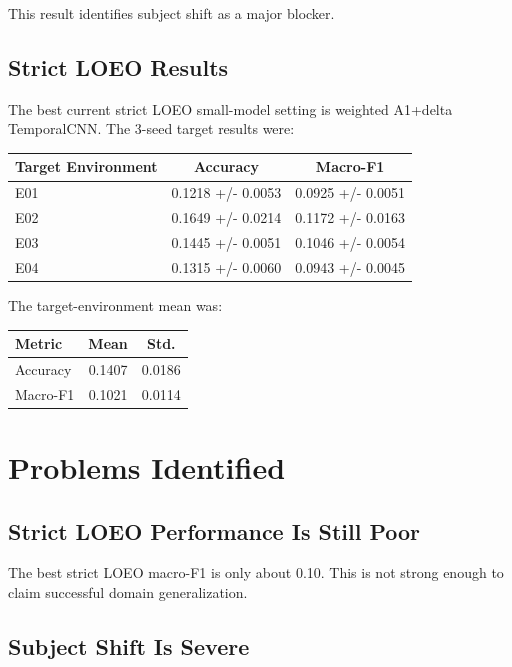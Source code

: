 \documentclass[11pt]{article}
\begin{document}
This result identifies subject shift as a major blocker.

\subsection{Strict LOEO Results}

The best current strict LOEO small-model setting is weighted A1+delta TemporalCNN. The 3-seed target results were:

\begin{center}
\begin{tabular}{lcc}
\toprule
Target Environment & Accuracy & Macro-F1 \\
\midrule
E01 & 0.1218 +/- 0.0053 & 0.0925 +/- 0.0051 \\
E02 & 0.1649 +/- 0.0214 & 0.1172 +/- 0.0163 \\
E03 & 0.1445 +/- 0.0051 & 0.1046 +/- 0.0054 \\
E04 & 0.1315 +/- 0.0060 & 0.0943 +/- 0.0045 \\
\bottomrule
\end{tabular}
\end{center}

The target-environment mean was:

\begin{center}
\begin{tabular}{lcc}
\toprule
Metric & Mean & Std. \\
\midrule
Accuracy & 0.1407 & 0.0186 \\
Macro-F1 & 0.1021 & 0.0114 \\
\bottomrule
\end{tabular}
\end{center}

\section{Problems Identified}

\subsection{Strict LOEO Performance Is Still Poor}

The best strict LOEO macro-F1 is only about 0.10. This is not strong enough to claim successful domain generalization.

\subsection{Subject Shift Is Severe}
\end{document}
